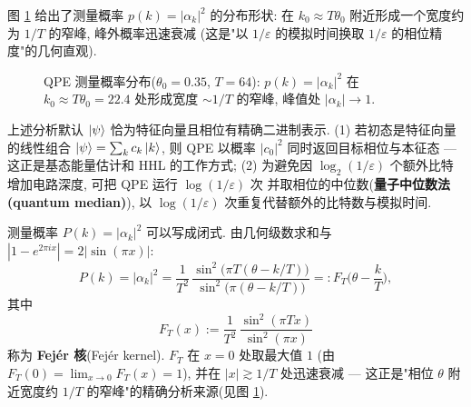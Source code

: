 \documentclass[utf8]{article} %
\numberwithin{equation}{section}   %
\newtheorem{Note}{\hskip 2em {\color{red} 注}}[subsection]
\begin{document}
图 \ref{fig:qpe} 给出了测量概率 $p(k) = |\alpha_k|^2$ 的分布形状: 在
$k_0 \approx T\theta_0$ 附近形成一个宽度约为 $1/T$ 的窄峰, 峰外概率迅速衰减
(这是"以 $1/\varepsilon$ 的模拟时间换取 $1/\varepsilon$ 的相位精度"的几何直观).

\begin{figure}[H]
\centering
{}
\caption{QPE 测量概率分布($\theta_0 = 0.35$, $T = 64$): $p(k) = |\alpha_k|^2$ 在
$k_0 \approx T\theta_0 = 22.4$ 处形成宽度 $\sim 1/T$ 的窄峰, 峰值处 $|\alpha_k| \to 1$.}
\label{fig:qpe}
\end{figure}

\begin{Note}[量子中位数法与两个假设的放松]
    上述分析默认 $\ket{\psi}$ 恰为特征向量且相位有精确二进制表示.
    (1) 若初态是特征向量的线性组合 $\ket{\psi} = \sum_k c_k \ket{k}$,
    则 QPE 以概率 $|c_0|^2$ 同时返回目标相位与本征态 --- 这正是基态能量估计和 HHL 的工作方式;
    (2) 为避免因 $\log_2(1/\varepsilon)$ 个额外比特增加电路深度, 可把 QPE 运行 $\log(1/\varepsilon)$ 次
    并取相位的中位数(\textbf{量子中位数法(quantum median)}), 以 $\log(1/\varepsilon)$ 次重复代替额外的比特数与模拟时间.
\end{Note}

\begin{Note}
    测量概率 $P(k) = |\alpha_k|^2$ 可以写成闭式. 由几何级数求和与
    $|1 - e^{2\pi i x}| = 2|\sin(\pi x)|$:
    \begin{equation}
        P(k) = |\alpha_k|^2 = \frac{1}{T^2}\,\frac{\sin^2\!\big(\pi T(\theta - k/T)\big)}{\sin^2\!\big(\pi(\theta - k/T)\big)}
        =: F_T\!\Big(\theta - \frac{k}{T}\Big),
    \end{equation}
    其中
    \begin{equation}
        F_T(x) := \frac{1}{T^2}\,\frac{\sin^2(\pi T x)}{\sin^2(\pi x)}
    \end{equation}
    称为 \textbf{Fejér 核}(Fejér kernel). $F_T$ 在 $x = 0$ 处取最大值 $1$
    (由 $F_T(0) = \lim_{x\to 0}F_T(x) = 1$), 并在 $|x| \gtrsim 1/T$ 处迅速衰减 ---
    这正是"相位 $\theta$ 附近宽度约 $1/T$ 的窄峰"的精确分析来源(见图 \ref{fig:qpe}).
\end{Note}
\end{document}
